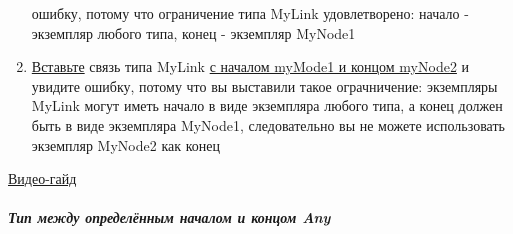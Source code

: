 \begin{enumerate}
            ошибку, потому что ограничение типа MyLink удовлетворено: начало -
            экземпляр
            любого типа, конец - экземпляр MyNode1
      \item \hyperlink{DeepCase.InsertLink.Description}{Вставьте} связь типа
            MyLink
            \hyperlink{FAQ.HowToInsertLinkWithFromAndTo}{с началом myMode1 и
                  концом
                  myNode2} и увидите ошибку, потому что вы выставили такое
            ограчничение:
            экземпляры MyLink могут иметь начало в виде экземпляра любого типа,
            а
            конец
            должен быть в виде экземпляра MyNode1, следовательно вы не можете
            использовать
            экземпляр MyNode2 как конец
\end{enumerate}
\href{https://youtu.be/XOVLeJfdqQM}{Видео-гайд}
\subparagraph{Тип между определённым началом и концом Any}
